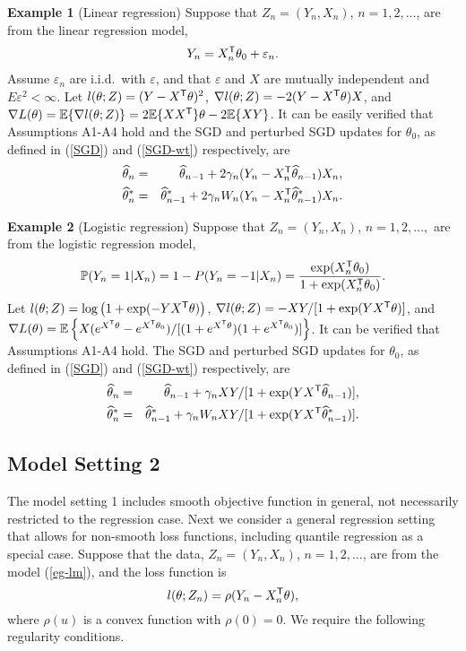 \documentclass[12pt]{article}
\def\trans{^{\rm \textsf{T}}}
\def\wh{\widehat}
\begin{document}
{\bf Example 1} (Linear regression) Suppose that $Z_n=(Y_n, X_n)$, $n=1, 2, \dots$, are from the linear regression model,
\begin{eqnarray}\label{eg-lm}
Y_n=X_n\trans\theta_0+\varepsilon_n.
\end{eqnarray}
Assume $\varepsilon_n$ are i.i.d.~with $\varepsilon$, and that $\varepsilon$ and $X$  are mutually independent and $E\varepsilon^2<\infty$.  Let $l(\theta; Z)=(Y-X\trans\theta)^2$, $\nabla l(\theta; Z)=-2(Y-X\trans\theta)X$, and $\nabla L(\theta)=\mathbb{E}\{\nabla l(\theta; Z)\}=2\mathbb{E}\{XX\trans\}\theta-2\mathbb{E}\{XY\}$. It can
 be easily verified that Assumptions A1-A4 hold and the SGD and perturbed SGD updates for $\theta_0$, as defined in (\ref{SGD}) and (\ref{SGD-wt}) respectively, are
\begin{eqnarray}
\wh{\theta}_n&=&\wh{\theta}_{n-1}+2\gamma_n(Y_n-X_n\trans\wh{\theta}_{n-1})X_n,\label{eg1-sgd}\\
\wh{\theta}^*_n&=&\wh{\theta}^*_{n-1}+2\gamma_nW_n(Y_n-X_n\trans\wh{\theta}^*_{n-1})X_n.\label{eg1-sgd-rw}
\end{eqnarray}


{\bf Example 2} (Logistic regression) Suppose that $Z_n=(Y_n, X_n)$, $n=1, 2, \dots,$ are from the logistic regression model,
\begin{eqnarray}\label{eg-logit}
\mathbb{P}(Y_n=1|X_n)=1-P(Y_n=-1|X_n)=\frac{\exp(X_n\trans\theta_0)}{1+\exp(X_n\trans\theta_0)}.
\end{eqnarray}
Let $l(\theta; Z)=\log\left(1+\exp(-YX\trans\theta)\right)$, $\nabla l(\theta; Z)=-XY/[1+\exp(YX\trans\theta)]$, and $\nabla L(\theta)=\mathbb{E}\left\{{X(e^{X\trans\theta}-e^{X\trans\theta_0})}/{[(1+e^{X\trans\theta})(1+e^{X\trans\theta_0})]}\right\}$. It can be verified that Assumptions A1-A4 hold. The SGD and perturbed SGD updates for $\theta_0$, as defined in (\ref{SGD}) and (\ref{SGD-wt}) respectively, are
\begin{eqnarray}
\wh{\theta}_n&=&\wh{\theta}_{n-1}+\gamma_nXY/[1+\exp(YX\trans\wh{\theta}_{n-1})],\label{eg2-sgd}\\
\wh{\theta}^*_n&=&\wh{\theta}^*_{n-1}+\gamma_nW_nXY/[1+\exp(YX\trans\wh{\theta}^*_{n-1})].\label{eg2-sgd-rw}
\end{eqnarray}

\subsection{Model Setting 2}
The model setting 1 includes smooth objective function in general, not necessarily restricted to the regression case.
Next we consider a general regression setting that allows for non-smooth loss functions, including
quantile regression as a special case. Suppose that the data, $Z_n=(Y_n, X_n)$, $n=1, 2, \dots$, are from the model (\ref{eg-lm}),
and the loss  function is
\begin{equation}\label{M-est}
l(\theta; Z_n)=\rho(Y_n-X_n\trans\theta),
\end{equation}
where $\rho(u)$ is a convex function with $\rho(0)=0$.  We require the following regularity conditions.
\end{document}
